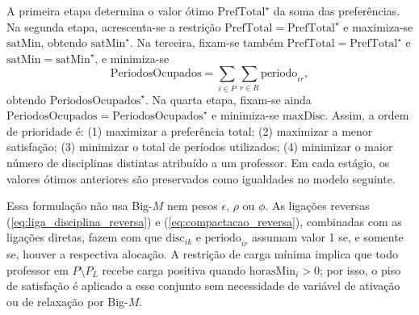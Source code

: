 \documentclass[11pt,a4paper]{article}
\begin{document}
A primeira etapa determina o valor ótimo $\mathrm{PrefTotal}^\star$ da soma das preferências. Na segunda etapa, acrescenta-se a restrição $\mathrm{PrefTotal}=\mathrm{PrefTotal}^\star$ e maximiza-se $\mathrm{satMin}$, obtendo $\mathrm{satMin}^\star$. Na terceira, fixam-se também $\mathrm{PrefTotal}=\mathrm{PrefTotal}^\star$ e $\mathrm{satMin}=\mathrm{satMin}^\star$, e minimiza-se
\[
\mathrm{PeriodosOcupados}=\sum_{i\in P}\sum_{r\in R}\mathrm{periodo}_{ir},
\]
obtendo $\mathrm{PeriodosOcupados}^\star$. Na quarta etapa, fixam-se ainda $\mathrm{PeriodosOcupados}=\mathrm{PeriodosOcupados}^\star$ e minimiza-se $\mathrm{maxDisc}$. Assim, a ordem de prioridade é: (1) maximizar a preferência total; (2) maximizar a menor satisfação; (3) minimizar o total de períodos utilizados; (4) minimizar o maior número de disciplinas distintas atribuído a um professor. Em cada estágio, os valores ótimos anteriores são preservados como igualdades no modelo seguinte.

Essa formulação não usa Big-$M$ nem pesos $\epsilon$, $\rho$ ou $\phi$. As ligações reversas (\ref{eq:liga_disciplina_reversa}) e (\ref{eq:compactacao_reversa}), combinadas com as ligações diretas, fazem com que $\mathrm{disc}_{ik}$ e $\mathrm{periodo}_{ir}$ assumam valor 1 se, e somente se, houver a respectiva alocação. A restrição de carga mínima implica que todo professor em $P\setminus P_L$ recebe carga positiva quando $\mathrm{horasMin}_{i}>0$; por isso, o piso de satisfação é aplicado a esse conjunto sem necessidade de variável de ativação ou de relaxação por Big-$M$.
\end{document}
